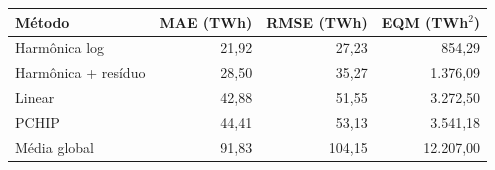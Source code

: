 \begin{tabular}{lrrr}
\toprule
Método & MAE (TWh) & RMSE (TWh) & EQM (TWh$^2$) \\
\midrule
Harmônica log & 21,92 & 27,23 & 854,29 \\
Harmônica + resíduo & 28,50 & 35,27 & 1.376,09 \\
Linear & 42,88 & 51,55 & 3.272,50 \\
PCHIP & 44,41 & 53,13 & 3.541,18 \\
Média global & 91,83 & 104,15 & 12.207,00 \\
\bottomrule
\end{tabular}
